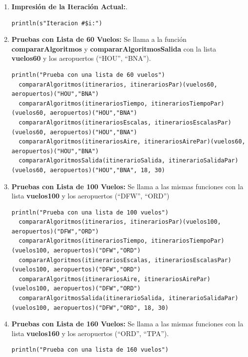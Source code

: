 \documentclass[letterpaper]{article}
\begin{document}
\begin{enumerate}
  \item \textbf{Impresión de la Iteración Actual:}.
  \begin{lstlisting}[caption={}, label={lst:contadorItraciones}, captionpos=b]
  println(s"Iteracion #$i:")
  \end{lstlisting}

  \item \textbf{Pruebas con Lista de 60 Vuelos:}
  Se llama a la función \textbf{compararAlgoritmos}  y \textbf{compararAlgoritmosSalida}  con la lista \textbf{vuelos60} y los aeropuertos (``HOU'', ``BNA'').
  \begin{lstlisting}[caption={}, label={lst:lista60}, captionpos=b]
  println("Prueba con una lista de 60 vuelos")
  compararAlgoritmos(itinerarios, itinerariosPar)(vuelos60, aeropuertos)("HOU","BNA")
  compararAlgoritmos(itinerariosTiempo, itinerariosTiempoPar)(vuelos60, aeropuertos)("HOU","BNA")
  compararAlgoritmos(itinerariosEscalas, itinerariosEscalasPar)(vuelos60, aeropuertos)("HOU","BNA")
  compararAlgoritmos(itinerariosAire, itinerariosAirePar)(vuelos60, aeropuertos)("HOU","BNA")
  compararAlgoritmosSalida(itinerarioSalida, itinerarioSalidaPar)(vuelos60, aeropuertos)("HOU","BNA", 18, 30)
  \end{lstlisting}
  \item \textbf{Pruebas con Lista de 100 Vuelos:}
  Se llama a las mismas funciones con la lista \textbf{vuelos100} y los aeropuertos (``DFW'', ``ORD'')
  \begin{lstlisting}[caption={}, label={lst:lista100}, captionpos=b]
  println("Prueba con una lista de 100 vuelos")
  compararAlgoritmos(itinerarios, itinerariosPar)(vuelos100, aeropuertos)("DFW","ORD")
  compararAlgoritmos(itinerariosTiempo, itinerariosTiempoPar)(vuelos100, aeropuertos)("DFW","ORD")
  compararAlgoritmos(itinerariosEscalas, itinerariosEscalasPar)(vuelos100, aeropuertos)("DFW","ORD")
  compararAlgoritmos(itinerariosAire, itinerariosAirePar)(vuelos100, aeropuertos)("DFW","ORD")
  compararAlgoritmosSalida(itinerarioSalida, itinerarioSalidaPar)(vuelos100, aeropuertos)("DFW","ORD", 18, 30)
  \end{lstlisting}
  \item \textbf{Pruebas con Lista de 160 Vuelos:}
  Se llama a las mismas funciones con la lista \textbf{vuelos160} y los aeropuertos (``ORD'', ``TPA'').
  \begin{lstlisting}[caption={}, label={lst:lista160}, captionpos=b]
  println("Prueba con una lista de 160 vuelos")

\end{lstlisting}
\end{enumerate}
\end{document}
